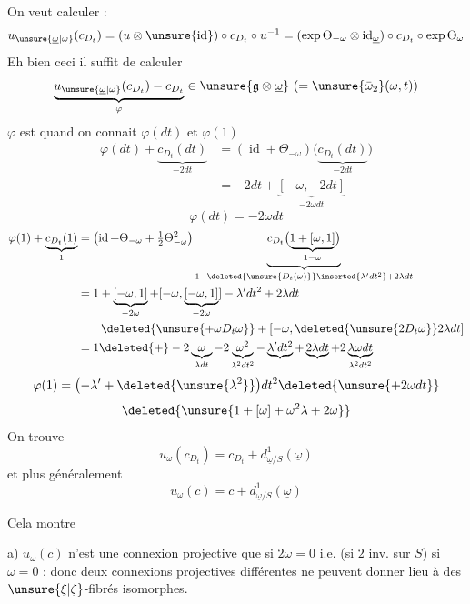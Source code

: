 On veut calculer :
\[
u_{\unsure{\underline{\omega}|\omega}}(c_{D_t})=(u\otimes\unsure{\operatorname{id}})\circ c_{D_t}\circ u^{-1}=(\exp\Theta_{-\omega}\otimes\operatorname{id}_{\underline{\omega}})\circ c_{D_t}\circ\exp\Theta_\omega
\]
Eh bien ceci il suffit de calculer
\[
\underbrace{u_{\unsure{\underline{\omega}|\omega}}(c_{D_t})-c_{D_t}}_{\varphi}\in\unsure{\mathfrak g\otimes\underline{\omega}}\ (=\unsure{\bar\omega_2}(\omega,t))
\]
$\varphi$ est  quand on connait $\varphi(dt)$ et $\varphi(1)$
\[
\begin{aligned}
\varphi(dt)+\underbrace{c_{D_t}(dt)}_{-2dt}
&=(\operatorname{id}+\Theta_{-\omega})\bigl(\underbrace{c_{D_t}(dt)}_{-2dt}\bigr)\\
&=-2dt+\underbrace{[-\omega,-2dt]}_{-2\omega dt}
\end{aligned}
\]
\[
\varphi(dt)=-2\omega dt
\]
\margin{\deleted{$\unsure{\varphi}$}}
\[
\begin{aligned}
\varphi(1)+\underbrace{c_{D_t}(1)}_1
&=\left(\operatorname{id}+\Theta_{-\omega}+\tfrac12\Theta_{-\omega}^{2}\right)
\underbrace{c_{D_t}\bigl(\underbrace{1+[\omega,1]}_{1-\omega}\bigr)}_{1-\deleted{\unsure{D_t(\omega)}}\inserted{\lambda'dt^2}+2\lambda dt}\\
&=1+\underbrace{[-\omega,1]}_{-2\omega}+[-\omega,\underbrace{[-\omega,1]}_{-2\omega}]-\lambda'dt^2+2\lambda dt\\
&\qquad\deleted{\unsure{+\omega D_t\omega}}+[-\omega,\deleted{\unsure{2D_t\omega}}2\lambda dt]\\
&=1\deleted{+}-2\underbrace{\omega}_{\lambda dt}-2\underbrace{\omega^2}_{\lambda^2dt^2}-\underbrace{\lambda'dt^2}+\underbrace{2\lambda dt}+2\underbrace{\lambda\omega dt}_{\lambda^2dt^2}
\end{aligned}
\]
\[
\varphi(1)=\bigl(-\lambda'+\deleted{\unsure{\lambda^2}}\bigr)dt^2\deleted{\unsure{+2\omega dt}}
\]
\[
\deleted{\unsure{1+[\omega]+\omega^2\lambda+2\omega}}
\]
On trouve
\[
u_\omega(c_{D_t})=c_{D_t}+d^1_{\underline{\omega}/S}(\underline{\omega})
\]
et plus généralement
\[
\boxed{u_\omega(c)=c+d^1_{\underline{\omega}/S}(\underline{\omega})}
\]

Cela montre

a) $u_\omega(c)$ n'est une connexion projective que si $2\omega=0$ i.e. (si $2$ inv. sur $S$) si $\omega=0$ : donc   deux connexions projectives différentes ne peuvent donner lieu à des $\unsure{\xi|\zeta}$-fibrés isomorphes.

